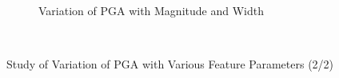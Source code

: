 \documentclass[a4paper,10pt]{article}
\begin{document}
\begin{figure}[h]
\begin{subfigure}[b]{0.45\textwidth}
         \caption{Variation of PGA with Magnitude and Width}
     \end{subfigure} \\
        \caption{Study of Variation of PGA with Various Feature Parameters (2/2)}
        \label{fig:datasets2}
\end{figure}


\fontsize{8}{9}\selectfont




\clearpage
\end{document}
